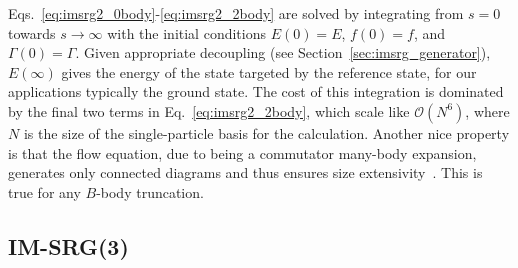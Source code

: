 Eqs.~\ref{eq:imsrg2_0body}-\ref{eq:imsrg2_2body} are solved by integrating
from $s=0$ towards $s\rightarrow\infty$ with the initial conditions
$E(0) = E$, $f(0) = f$, and $\Gamma(0)=\Gamma$.
Given appropriate decoupling (see Section~\ref{sec:imsrg_generator}),
$E(\infty)$ gives the energy of the state targeted by the reference state,
for our applications typically the ground state.
The cost of this integration is dominated by the final two terms in Eq.~\ref{eq:imsrg2_2body},
which scale like $\mathcal{O}(N^6)$,
where $N$ is the size of the single-particle basis for the calculation.
Another nice property is that the flow equation,
due to being a commutator many-body expansion,
generates only connected diagrams and thus ensures size extensivity~\cite{Herg15imsrgphysrep}.
This is true for any $B$-body truncation.

\subsection{IM-SRG(3)}

